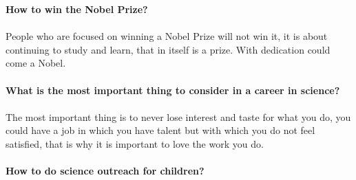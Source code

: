 \documentclass[10pt,letterpaper]{article}
\begin{document}
\textbf{How to win the Nobel Prize?}
\\
\\
People who are focused on winning a Nobel Prize will not win it, it is about continuing to study and learn, that in itself is a prize. With dedication could come a Nobel.
\\
\\
\textbf{What is the most important thing to consider in a career in science?}
\\
\\
The most important thing is to never lose interest and taste for what you do, you could have a job in which you have talent but with which you do not feel satisfied, that is why it is important to love the work you do.
\\
\\
\textbf{How to do science outreach for children?}
\\
\end{document}
